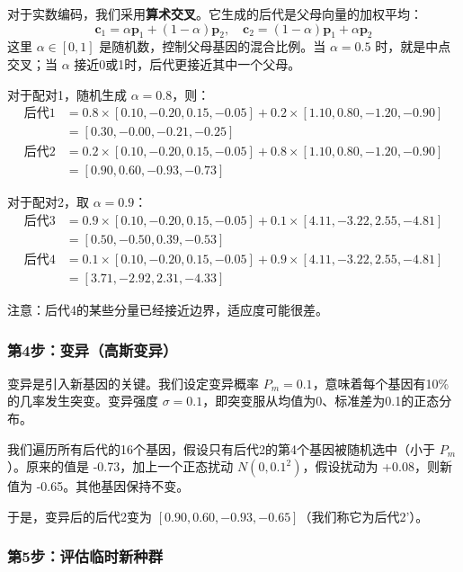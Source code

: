 \documentclass[lang=cn,zihao=-4,a4paper,fontset=windows]{beautybook}
\begin{document}
对于实数编码，我们采用\textbf{算术交叉}。它生成的后代是父母向量的加权平均：
\[
\mathbf{c}_1 = \alpha \mathbf{p}_1 + (1-\alpha) \mathbf{p}_2, \quad
\mathbf{c}_2 = (1-\alpha) \mathbf{p}_1 + \alpha \mathbf{p}_2
\]
这里 $\alpha \in [0,1]$ 是随机数，控制父母基因的混合比例。当 $\alpha=0.5$ 时，就是中点交叉；当 $\alpha$ 接近0或1时，后代更接近其中一个父母。

对于配对1，随机生成 $\alpha = 0.8$，则：
\[
\begin{aligned}
\text{后代1} &= 0.8 \times [0.10,-0.20,0.15,-0.05] + 0.2 \times [1.10,0.80,-1.20,-0.90] \\
&= [0.30, -0.00, -0.21, -0.25] \\
\text{后代2} &= 0.2 \times [0.10,-0.20,0.15,-0.05] + 0.8 \times [1.10,0.80,-1.20,-0.90] \\
&= [0.90, 0.60, -0.93, -0.73]
\end{aligned}
\]

对于配对2，取 $\alpha = 0.9$：
\[
\begin{aligned}
\text{后代3} &= 0.9 \times [0.10,-0.20,0.15,-0.05] + 0.1 \times [4.11,-3.22,2.55,-4.81] \\
&= [0.50, -0.50, 0.39, -0.53] \\
\text{后代4} &= 0.1 \times [0.10,-0.20,0.15,-0.05] + 0.9 \times [4.11,-3.22,2.55,-4.81] \\
&= [3.71, -2.92, 2.31, -4.33]
\end{aligned}
\]

注意：后代4的某些分量已经接近边界，适应度可能很差。

\subsubsection{第4步：变异（高斯变异）}

变异是引入新基因的关键。我们设定变异概率 $P_m = 0.1$，意味着每个基因有10\%的几率发生突变。变异强度 $\sigma = 0.1$，即突变服从均值为0、标准差为0.1的正态分布。

我们遍历所有后代的16个基因，假设只有后代2的第4个基因被随机选中（小于 $P_m$）。原来的值是 -0.73，加上一个正态扰动 $N(0,0.1^2)$，假设扰动为 +0.08，则新值为 -0.65。其他基因保持不变。

于是，变异后的后代2变为 $[0.90, 0.60, -0.93, -0.65]$（我们称它为后代2'）。

\subsubsection{第5步：评估临时新种群}
\end{document}
